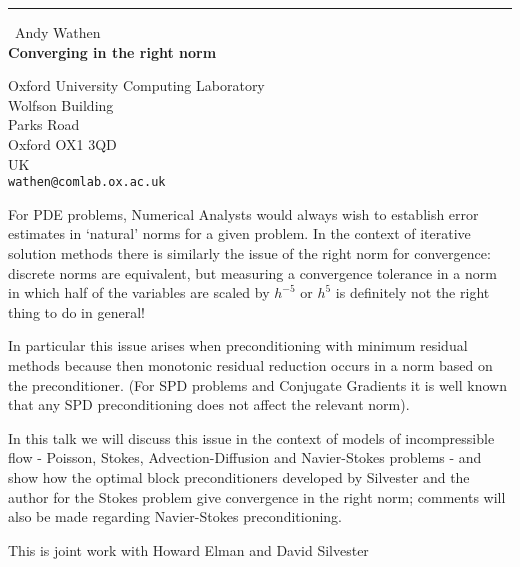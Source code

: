 \documentclass{report}
\begin{document}
\begin{center}
\rule{6in}{1pt} \
{\large Andy Wathen \\
{\bf Converging in the right norm}}

Oxford University Computing Laboratory \\ Wolfson Building \\ Parks Road \\ Oxford OX1 3QD \\ UK
\\
{\tt wathen@comlab.ox.ac.uk}\end{center}

For PDE problems, Numerical Analysts would always wish to
establish error estimates in `natural' norms for a given problem.
In the context of iterative solution methods there is similarly
the issue of the right norm for convergence: discrete norms are
equivalent, but measuring a convergence tolerance in a norm in
which half of the variables are scaled by $h^{-5}$ or $h^5$ is
definitely not the right thing to do in general!

In particular this issue arises when preconditioning with
minimum residual methods because then monotonic residual reduction
occurs in a norm based on the preconditioner. (For SPD problems
and Conjugate Gradients it is well known that any SPD
preconditioning does not affect the relevant norm).

In this talk we will discuss this issue in the context of models
of incompressible flow - Poisson, Stokes, Advection-Diffusion and
Navier-Stokes problems - and show how the optimal block
preconditioners developed by Silvester and the author for the
Stokes problem give convergence in the right norm; comments will
also be made regarding Navier-Stokes preconditioning.


This is joint work with Howard Elman and David Silvester
\end{document}
